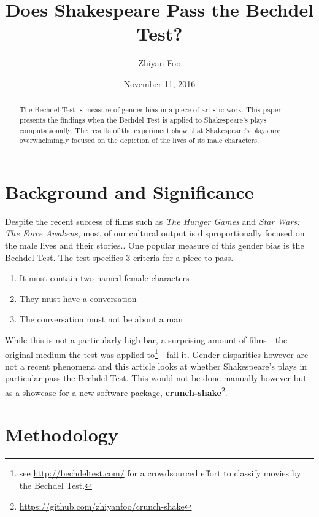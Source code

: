 \documentclass[12pt]{article}
\begin{document}
\title{Does Shakespeare Pass the Bechdel Test?}
\date{November 11, 2016}
\author{Zhiyan Foo}
\maketitle
\begin{abstract}
The Bechdel Test is measure of gender bias in a piece of artistic work. This
    paper presents the findings when the Bechdel Test is applied to
    Shakespeare's plays computationally. The results of the experiment show
    that Shakespeare's plays are overwhelmingly focused on the depiction of the
lives of its male characters. \end{abstract}
\section{Background and Significance}
\label{sec:background_and_significance}

Despite the recent success of films such as \emph{The Hunger Games} and
\emph{Star Wars: The Force Awakens}, most of our cultural output is
disproportionally focused on the male lives and their stories.\cite{atlantic}. One popular
measure of this gender bias is the Bechdel Test\cite{polygraph}. The test
specifies 3 criteria for a piece to pass. 
\begin{enumerate}  
\item It must contain two named female characters
\item They must have a conversation
\item The conversation must not be about a man
\end{enumerate}
While this is not a particularly high bar, a surprising amount of films---the
original medium the test was applied to\footnote{see
\url{http://bechdeltest.com/} for a crowdsourced effort to classify movies by
the Bechdel Test.}---fail it. Gender disparities however are not a recent
phenomena and this article looks at whether Shakespeare's plays in particular
pass the Bechdel Test. This would not be done manually however but as a
showcase for a new software package, \textbf{crunch-shake}\footnote{\url{https://github.com/zhiyanfoo/crunch-shake}}.

\section{Methodology}
\label{sec:methodology}
\end{document}
